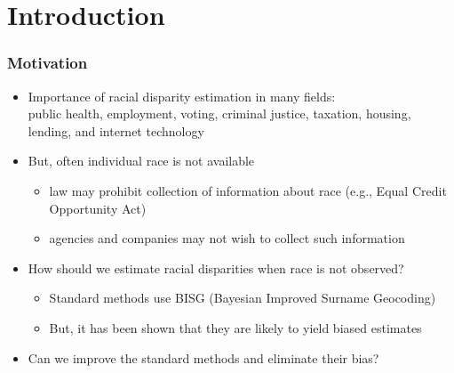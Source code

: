 \documentclass{beamer}
\title[]{\tit}
\institute[Harvard]{\large Harvard University }
\date{Annual Meeting of the American Political Science Association\\
  September 2, 2023 \\  \vspace{.25in} Joint work with
  Cory McCartan, Jacob Goldin, and Daniel E. Ho }
\author[Kosuke Imai]{\large Kosuke Imai }
\begin{document}
\frame{\titlepage}



\section{Introduction}

\begin{frame}

  \frametitle{Motivation}

  \begin{itemize}
  \item Importance of racial disparity estimation in many fields:\\
    public health, employment, voting, criminal justice, taxation,
    housing, lending, and internet technology

    \vfill
  \item But, often individual race is not available
    \begin{itemize}
    \item law may prohibit collection of information about race
      (e.g., Equal Credit Opportunity Act)
    \item agencies and companies may not wish to collect such information
    \end{itemize}
    \vfill
  \item How should we estimate racial disparities when race is not
    observed?
    \begin{itemize}
    \item Standard methods use BISG (Bayesian Improved Surname
      Geocoding)
    \item But, it has been shown that they are likely to yield biased estimates
    \end{itemize}

  \item Can we improve the standard methods and eliminate their bias? 
  \end{itemize}

\end{frame}
\end{document}
